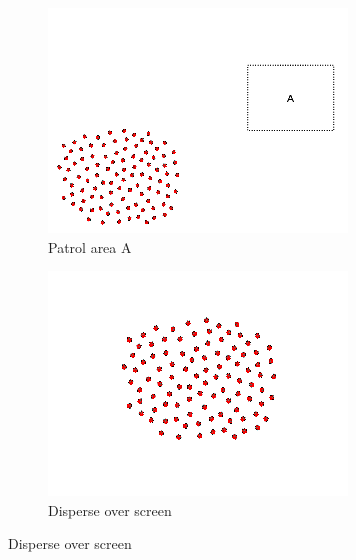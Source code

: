 \documentclass[]{article}
\begin{document}
\begin{figure}
	\ContinuedFloat
	\centering	
		\begin{subfigure}{0.42\textwidth}
		\centering
		\includegraphics[width=\linewidth]{slide_images/Swarm_Robot_Control_-_100_Robot_0035.png}
		\caption{Patrol area A}
		\label{fig:sub1}
	\end{subfigure}%
	\begin{subfigure}{0.42\textwidth}
		\centering
		\includegraphics[width=\linewidth]{slide_images/Swarm_Robot_Control_-_100_Robot_0037.png}
		\caption{Disperse over screen}
		\label{fig:sub2}
	\end{subfigure}
	\label{fig:100_robot_slides}
\end{figure}
\end{document}
